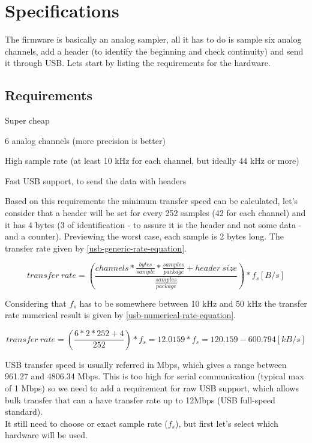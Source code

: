 \section{Specifications}
\label{firmware-specifications}

The firmware is basically an analog sampler, all it has to do is sample six analog
channels, add a header (to identify the beginning and check continuity) and send it
through USB. Lets start by listing the requirements for the hardware.

\subsection{Requirements}
\begin{itemlist}
  \item Super cheap
  \item 6 analog channels (more precision is better)
  \item High sample rate (at least 10 kHz for each channel, but ideally 44 kHz or more)
  \item Fast USB support, to send the data with headers
\end{itemlist}
Based on this requirements the minimum transfer speed can be calculated, let's
consider that a header will be set for every 252 samples (42 for each channel) and
it has 4 bytes (3 of identification - to assure it is the header and not some
data - and a counter). Previewing the worst case, each sample is 2 bytes long.
The transfer rate given by \autoref{usb-generic-rate-equation}.

\begin{equation}
  \label{usb-generic-rate-equation}
  transfer\ rate = \left( \frac{channels * \frac{bytes}{sample} * \frac{samples}{package} + header\ size}{\frac{samples}{package}}  \right ) * f_{s} [B/s]
\end{equation}

Considering that $f_{s}$ has to be somewhere between 10 kHz and 50 kHz the transfer
rate numerical result is given by \autoref{usb-numerical-rate-equation}.

\begin{equation}
  \label{usb-numerical-rate-equation}
  transfer\ rate = \left( \frac{6 * 2 * 252 + 4}{252}  \right ) * f_{s} = 12.0159 * f_{s} = 120.159 - 600.794 [kB/s]
\end{equation}

USB transfer speed is usually referred in Mbps, which gives a range between
961.27 and 4806.34 Mbps. This is too high for serial communication (typical max of
1 Mbps) so we need to add a requirement for raw USB support, which allows bulk
transfer that can a have transfer rate up to 12Mbps (USB full-speed standard).\\
It still need to choose or exact sample rate ($f_{s}$), but first let's select which
hardware will be used.

